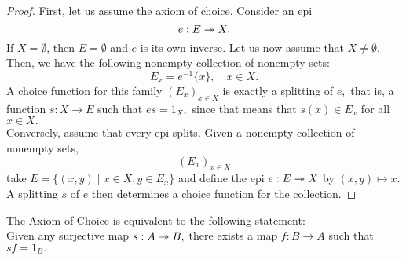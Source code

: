 \begin{proof} 
	First, let us assume the axiom of choice. Consider an epi
	\begin{equation*} 
		e : E \twoheadrightarrow X.
	\end{equation*}
	If $X = \emptyset$, then $E = \emptyset$ and $e$ is its own inverse. Let us now assume that $X \neq \emptyset.$\\
	Then, we have the following nonempty collection of nonempty sets:
	\begin{equation*} 
		E_x = e^{-1}\{x\}, \quad x \in X.
	\end{equation*}
	A choice function for this family $(E_x)_{x \in X}$ is exactly a splitting of $e,$ that is, a function $s:X \to E$ such that $es = 1_X,$ since that means that $s(x) \in E_x$ for all $x \in X.$\\
	Conversely, assume that every epi splits. Given a nonempty collection of nonempty sets,
	\begin{equation*} 
		(E_x)_{x\in X}
	\end{equation*}
	take $E = \{(x, y) \mid x \in X, y \in E_x\}$ and define the epi $e:E\twoheadrightarrow X$ by $(x, y) \mapsto x.$ A splitting $s$ of $e$ then determines a choice function for the collection.
\end{proof}
\begin{cor}
	The Axiom of Choice is equivalent to the following statement:\\
	Given any surjective map $s:A \twoheadrightarrow B,$ there exists a map $f:B\to A$ such that $sf = 1_B.$
\end{cor}
